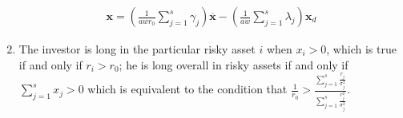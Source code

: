 \documentclass[10pt]{beamer}
\newcommand{\ds}{\displaystyle}
\theoremstyle{definition}
\begin{document}
\begin{frame}[allowframebreaks]
\begin{enumerate}
      \begin{align*}
        \mathbf{x} = \left(\frac{1}{awr_0}\sum_{j=1}^s \gamma_j\right)\overline{\mathbf{x}} - \left(\frac{1}{aw}\sum_{j=1}^s \lambda_j\right)\mathbf{x}_d
      \end{align*}
    \item 
      The investor is long in the particular risky asset $i$ when $x_i > 0$, which is true if and only if $r_i > r_0$; he is long overall in risky assets if and only if $\ds\sum_{j=1}^s x_j > 0$ which is equivalent to the condition that $\ds\frac{1}{r_0} > \frac{\sum_{j=1}^s\frac{r_j}{\sigma_j^2}}{\sum_{j=1}^s\frac{r_j^2}{\sigma_j^2}}$.
  \end{enumerate}
\end{frame}

%  
%  
\end{document}
